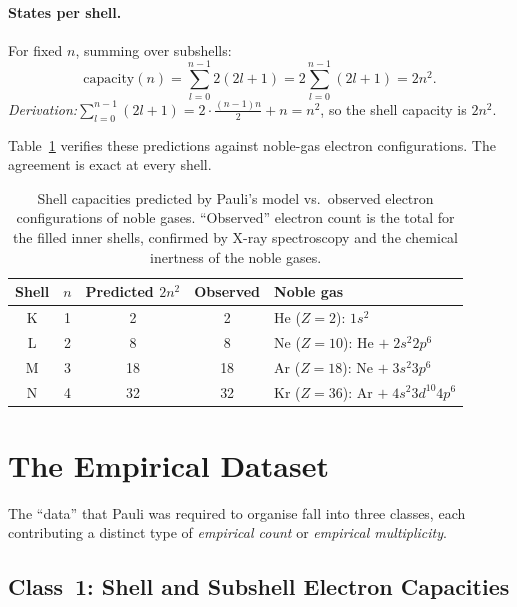 \documentclass[12pt]{article}
\begin{document}
\paragraph{States per shell.}
For fixed $n$, summing over subshells:
\begin{equation}\label{eq:shell_count}
  \text{capacity}(n) = \sum_{l=0}^{n-1} 2(2l+1)
  = 2\sum_{l=0}^{n-1}(2l+1) = 2n^2.
\end{equation}
\textit{Derivation:}\quad $\displaystyle\sum_{l=0}^{n-1}(2l+1)
  = 2\cdot\frac{(n-1)n}{2} + n = n^2$, so the shell capacity is $2n^2$.

Table~\ref{tab:shell} verifies these predictions against noble-gas
electron configurations.  The agreement is exact at every shell.

\begin{table}[ht]
\centering
\caption{Shell capacities predicted by Pauli's model vs.\ observed
electron configurations of noble gases.  ``Observed'' electron count is
the total for the filled inner shells, confirmed by X-ray spectroscopy and
the chemical inertness of the noble gases.}
\label{tab:shell}
\medskip
\begin{tabular}{ccccl}
\toprule
Shell & $n$ & Predicted $2n^2$ & Observed & Noble gas \\
\midrule
K & 1 &  2 &  2 & He ($Z=2$): $1s^2$ \\
L & 2 &  8 &  8 & Ne ($Z=10$): He $+\;2s^2 2p^6$ \\
M & 3 & 18 & 18 & Ar ($Z=18$): Ne $+\;3s^2 3p^6$ \\
N & 4 & 32 & 32 & Kr ($Z=36$): Ar $+\;4s^2 3d^{10} 4p^6$ \\
\bottomrule
\end{tabular}
\end{table}

\section{The Empirical Dataset}
\label{sec:data}

The ``data'' that Pauli was required to organise fall into three classes,
each contributing a distinct type of \emph{empirical count} or
\emph{empirical multiplicity}.

\subsection{Class~1: Shell and Subshell Electron Capacities}
\end{document}
